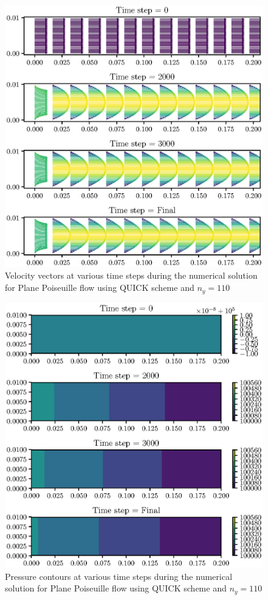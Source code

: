 \documentclass[12pt,a4paper,fleqn]{article}
\begin{document}
\begin{figure}[H]
  \centering
  \includegraphics[width=\linewidth]{navierFVD-velocityVectors.eps}
  \caption{Velocity vectors at various time steps during the numerical solution for Plane Poiseuille flow using QUICK scheme and $n_y = 110$}
\end{figure}
\begin{figure}[H]
  \centering
  \includegraphics[width=\linewidth]{navierFVD-pressureContours.eps}
  \caption{Pressure contours at various time steps during the numerical solution for Plane Poiseuille flow using QUICK scheme and $n_y = 110$}
\end{figure}
\end{document}
